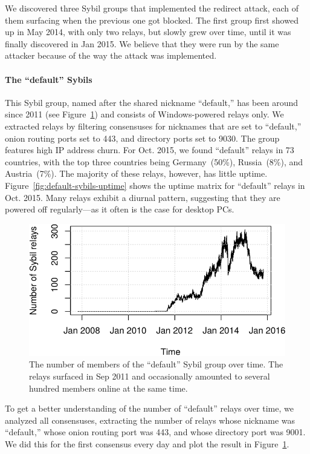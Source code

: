 We discovered three Sybil groups that implemented the redirect attack, each of
them surfacing when the previous one got blocked.  The first group first showed
up in May 2014, with only two relays, but slowly grew over time, until it was
finally discovered in Jan 2015.  We believe that they were run by the same
attacker because of the way the attack was implemented.

\paragraph{The ``default'' Sybils}
This Sybil group, named after the shared nickname ``default,'' has been around
since 2011 (see Figure~\ref{fig:default-over-time}) and consists of
Windows-powered relays only.  We extracted relays by filtering consensuses
for nicknames that are set to ``default,'' onion routing ports set to 443, and
directory ports set to 9030.  The group features high IP address churn.  For
Oct. 2015, we found ``default'' relays in 73 countries, with the top three
countries being Germany~(50\%), Russia~(8\%), and Austria~(7\%).  The majority
of these relays, however, has little uptime.
Figure~\ref{fig:default-sybils-uptime} shows the uptime matrix for ``default''
relays in Oct. 2015.  Many relays exhibit a diurnal pattern, suggesting
that they are powered off regularly---as it often is the case for desktop PCs.

\begin{figure}[t]
	\centering
	\includegraphics[width=\linewidth]{diagrams/default-over-time}
	\caption{The number of members of the ``default'' Sybil group over time.
		The relays surfaced in Sep 2011 and occasionally amounted to several
		hundred members online at the same time.}
	\label{fig:default-over-time}
\end{figure}

To get a better understanding of the number of ``default'' relays over time, we
analyzed all consensuses, extracting the number of relays whose nickname was
``default,'' whose onion routing port was 443, and whose directory port was
9001.  We did this for the first consensus every day and plot the result in
Figure~\ref{fig:default-over-time}.

